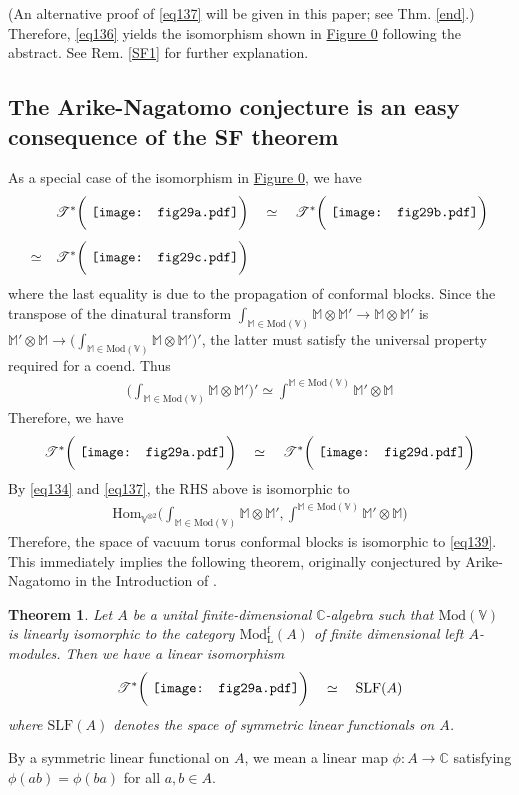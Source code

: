 \documentclass[11pt,b5paper,notitlepage]{article}
\theoremstyle{definition}
\theoremstyle{plain}
\newtheorem{thm}[df]{Theorem}
\newcommand{\Hom}{\mathrm{Hom}}
\newcommand{\SLF}{\mathrm{SLF}}
\newcommand{\Vbb}{\mathbb V}
\newcommand{\Mbb}{\mathbb M}
\newcommand{\Cbb}{\mathbb C}
\newcommand{\<}{\left\langle}
\renewcommand{\>}{\right\rangle}
\newcommand{\ST}{\mathscr{T}}
\newcommand{\Mod}{\mathrm{Mod}}
\newcommand{\ModfL}{\mathrm{Mod}^{\mathrm f}_{\mathrm L}}
\numberwithin{equation}{section}
\begin{document}
(An alternative proof of \eqref{eq137} will be given in this paper; see Thm. \ref{end}.) Therefore, \eqref{eq136} yields the isomorphism shown in \hyperlink{figsfend}{Figure 0} following the abstract. See Rem. \ref{SF1} for further explanation.


\subsection{The Arike-Nagatomo conjecture is an easy consequence of the SF theorem}\label{lb80}


As a special case of the isomorphism in \hyperlink{figsfend}{Figure 0}, we have
\begin{align*}
&\ST^*\bigg(\vcenter{\hbox{{
		\texttt{[image: fig29a.pdf]}}}}\bigg)\quad\simeq\quad\ST^*\bigg(\vcenter{\hbox{{
		\texttt{[image: fig29b.pdf]}}}}\bigg)\\[1ex]
\simeq\quad&\ST^*\bigg(\vcenter{\hbox{{
		\texttt{[image: fig29c.pdf]}}}}\bigg)
\end{align*}
where the last equality is due to the propagation of conformal blocks. Since the transpose of the dinatural transform $\int_{\Mbb\in\Mod(\Vbb)}\Mbb\otimes\Mbb'\rightarrow\Mbb\otimes\Mbb'$ is $\Mbb'\otimes\Mbb\rightarrow\big(\int_{\Mbb\in\Mod(\Vbb)}\Mbb\otimes\Mbb'\big)'$, the latter must satisfy the universal property required for a coend. Thus
\begin{align*}
\Big(\int_{\Mbb\in\Mod(\Vbb)}\Mbb\otimes\Mbb'\Big)'\simeq\int^{\Mbb\in\Mod(\Vbb)}\Mbb'\otimes\Mbb
\end{align*}
Therefore, we have
\begin{align*}
\ST^*\bigg(\vcenter{\hbox{{
		\texttt{[image: fig29a.pdf]}}}}\bigg)\quad\simeq\quad\ST^*\bigg(\vcenter{\hbox{{
		\texttt{[image: fig29d.pdf]}}}}\bigg)
\end{align*}
By \eqref{eq134} and \eqref{eq137}, the RHS above is isomorphic to
\begin{align}\label{eq139}
\Hom_{\Vbb^{\otimes2}}\Big(\int_{\Mbb\in\Mod(\Vbb)}\Mbb\otimes\Mbb',\int^{\Mbb\in\Mod(\Vbb)}\Mbb'\otimes\Mbb\Big)
\end{align}
Therefore, the space of vacuum torus conformal blocks is isomorphic to \eqref{eq139}. This immediately implies the following theorem, originally conjectured by Arike-Nagatomo in the Introduction of \cite{AN03-finite-dimensional}.

\begin{thm}\label{lb78}
Let $A$ be a unital finite-dimensional $\Cbb$-algebra such that $\Mod(\Vbb)$ is linearly isomorphic to the category $\ModfL(A)$ of finite dimensional left $A$-modules. Then we have a linear isomorphism
\begin{align}\label{eq140}
\ST^*\bigg(\vcenter{\hbox{{
		\texttt{[image: fig29a.pdf]}}}}\bigg)\quad\simeq\quad\SLF(A)
\end{align}
where $\SLF(A)$ denotes the space of symmetric linear functionals on $A$.
\end{thm}
By a symmetric linear functional on $A$, we mean a linear map $\phi:A\rightarrow\Cbb$ satisfying $\phi(ab)=\phi(ba)$ for all $a,b\in A$.
\end{document}
